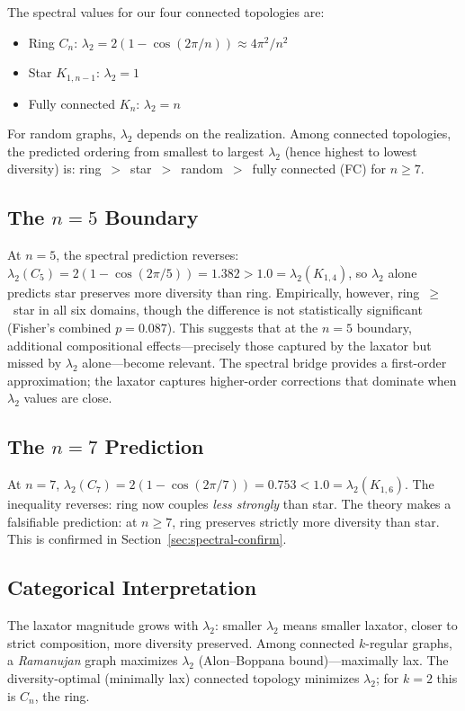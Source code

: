 \documentclass[submission,copyright,creativecommons]{eptcs}
\begin{document}
The spectral values for our four connected topologies are:
\begin{itemize}
\item Ring $C_n$: $\lambda_2 = 2(1 - \cos(2\pi/n)) \approx 4\pi^2/n^2$
\item Star $K_{1,n-1}$: $\lambda_2 = 1$
\item Fully connected $K_n$: $\lambda_2 = n$
\end{itemize}
For random graphs, $\lambda_2$ depends on the realization.
Among connected topologies, the predicted ordering from smallest to
largest $\lambda_2$ (hence highest to lowest diversity) is:
ring~$>$~star~$>$~random~$>$~fully connected (FC) for $n \geq 7$.

\subsection{The \texorpdfstring{$n{=}5$}{n=5} Boundary}

At $n{=}5$, the spectral prediction reverses:
$\lambda_2(C_5) = 2(1 - \cos(2\pi/5)) = 1.382 > 1.0 =
\lambda_2(K_{1,4})$, so $\lambda_2$ alone predicts star preserves
more diversity than ring. Empirically, however, ring~$\geq$~star in
all six domains, though the difference is not statistically
significant (Fisher's combined $p = 0.087$). This suggests that at
the $n{=}5$ boundary, additional compositional effects---precisely
those captured by the laxator but missed by $\lambda_2$
alone---become relevant. The spectral bridge provides a first-order
approximation; the laxator captures higher-order corrections that
dominate when $\lambda_2$ values are close.

\subsection{The \texorpdfstring{$n{=}7$}{n=7} Prediction}

At $n{=}7$, $\lambda_2(C_7) = 2(1 - \cos(2\pi/7)) = 0.753 < 1.0 =
\lambda_2(K_{1,6})$. The inequality reverses: ring now couples
\emph{less strongly} than star. The theory makes a falsifiable
prediction: at $n \geq 7$, ring preserves strictly more diversity
than star. This is confirmed in Section~\ref{sec:spectral-confirm}.

\subsection{Categorical Interpretation}

The laxator magnitude grows with $\lambda_2$: smaller $\lambda_2$
means smaller laxator, closer to strict composition, more diversity
preserved. Among connected $k$-regular graphs, a \emph{Ramanujan}
graph maximizes $\lambda_2$ (Alon--Boppana bound)---maximally lax.
The diversity-optimal (minimally lax) connected topology minimizes
$\lambda_2$; for $k{=}2$ this is $C_n$, the ring.
\end{document}

